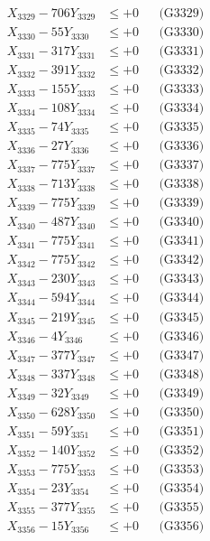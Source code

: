 \documentclass[a4paper,10pt]{article}
\begin{document}
{\begin{align}
X_{3329} - 706Y_{3329} &\leq +0 && \text{(G3329)} \\
X_{3330} - 55Y_{3330} &\leq +0 && \text{(G3330)} \\
\allowbreak
X_{3331} - 317Y_{3331} &\leq +0 && \text{(G3331)} \\
X_{3332} - 391Y_{3332} &\leq +0 && \text{(G3332)} \\
X_{3333} - 155Y_{3333} &\leq +0 && \text{(G3333)} \\
X_{3334} - 108Y_{3334} &\leq +0 && \text{(G3334)} \\
X_{3335} - 74Y_{3335} &\leq +0 && \text{(G3335)} \\
X_{3336} - 27Y_{3336} &\leq +0 && \text{(G3336)} \\
X_{3337} - 775Y_{3337} &\leq +0 && \text{(G3337)} \\
X_{3338} - 713Y_{3338} &\leq +0 && \text{(G3338)} \\
X_{3339} - 775Y_{3339} &\leq +0 && \text{(G3339)} \\
X_{3340} - 487Y_{3340} &\leq +0 && \text{(G3340)} \\
\allowbreak
X_{3341} - 775Y_{3341} &\leq +0 && \text{(G3341)} \\
X_{3342} - 775Y_{3342} &\leq +0 && \text{(G3342)} \\
X_{3343} - 230Y_{3343} &\leq +0 && \text{(G3343)} \\
X_{3344} - 594Y_{3344} &\leq +0 && \text{(G3344)} \\
X_{3345} - 219Y_{3345} &\leq +0 && \text{(G3345)} \\
X_{3346} - 4Y_{3346} &\leq +0 && \text{(G3346)} \\
X_{3347} - 377Y_{3347} &\leq +0 && \text{(G3347)} \\
X_{3348} - 337Y_{3348} &\leq +0 && \text{(G3348)} \\
X_{3349} - 32Y_{3349} &\leq +0 && \text{(G3349)} \\
X_{3350} - 628Y_{3350} &\leq +0 && \text{(G3350)} \\
\allowbreak
X_{3351} - 59Y_{3351} &\leq +0 && \text{(G3351)} \\
X_{3352} - 140Y_{3352} &\leq +0 && \text{(G3352)} \\
X_{3353} - 775Y_{3353} &\leq +0 && \text{(G3353)} \\
X_{3354} - 23Y_{3354} &\leq +0 && \text{(G3354)} \\
X_{3355} - 377Y_{3355} &\leq +0 && \text{(G3355)} \\
X_{3356} - 15Y_{3356} &\leq +0 && \text{(G3356)} \\

\end{align}}
\end{document}
